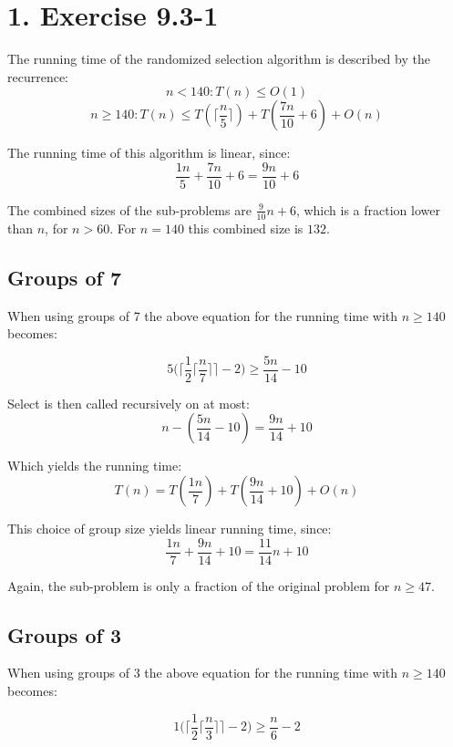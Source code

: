\documentclass[10pt,oneside,a4paper,final,english]{memoir}
\begin{document}




\maketitle
\newpage

\section*{1. Exercise 9.3-1}

The running time of the randomized selection algorithm is described by
the recurrence:
\[ n < 140:    T(n) \leq O(1) \]
\[ n \geq 140: T(n) \leq T(\lceil \frac{n}{5} \rceil) +
   T(\frac{7n}{10} + 6) + O(n) \]

The running time of this algorithm is linear, since:
\[ \frac{1n}{5} + \frac{7n}{10} + 6 = \frac{9n}{10} + 6 \]

The combined sizes of the sub-problems are $\frac{9}{10}n + 6$, which
is a fraction lower than $n$, for $n > 60$. For $n = 140$ this
combined size is $132$.

\subsection{Groups of 7}
When using groups of 7 the above equation for the running time with $n
\geq 140$ becomes:

\[ 5 \Big( \lceil
   \frac{1}{2} \lceil \frac{n}{7} \rceil \rceil - 2 \Big) \geq
   \frac{5n}{14} - 10\]

Select is then called recursively on at most:
\[ n - (\frac{5n}{14} - 10) = \frac{9n}{14} + 10 \]

Which yields the running time:
\[ T(n) = T(\frac{1n}{7}) + T(\frac{9n}{14} + 10) + O(n) \]

This choice of group size yields linear running time, since:
\[ \frac{1n}{7} + \frac{9n}{14} + 10 = \frac{11}{14}n + 10\]

Again, the sub-problem is only a fraction of the original problem for
$n \geq 47$.

\subsection{Groups of 3}
When using groups of 3 the above equation for the running time with $n
\geq 140$ becomes:

\[ 1 \Big( \lceil
   \frac{1}{2} \lceil \frac{n}{3} \rceil \rceil - 2 \Big) \geq
   \frac{n}{6} - 2\]
\end{document}
